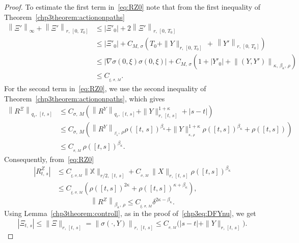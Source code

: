 \documentclass[10pt]{amsart}
\theoremstyle{definition}\newtheorem{defi}[theo]{Definition}\newtheorem{rema}[theo]{Remark}\newtheorem{exam}[theo]{Example}\newtheorem{exem}[theo]{Example}\newtheorem{nota}[theo]{Notation}
\newcommand{\bbX}{\mathbb{X}}
\begin{document}
\begin{proof}
To estimate the first term in~\eqref{eq:RZ0} note that from the first inequality of Theorem~\ref{chp3theorem:actiononpaths}
\begin{equation}\label{chp3eq:Xixiineq}
\begin{split}
\left\|\Xi'\right\|_{\infty}+\left\|\Xi'\right\|_{r,\,\left[0,\,T_0\right]}
&\leq \left|\Xi'_0\right|+2\left\|\Xi'\right\|_{r,\,\left[0,\,T_0\right]}\\
&\leq\left|\Xi'_0\right|+ C_{M,\,{\sigma}}\left(T_0+\|Y\|_{r,\,\left[0,\,T_0\right]}\, +\, \left\|Y'\right\|_{r,\,\left[0,\,T_0\right]}\right)\\
&\leq\left|\nabla \sigma (0, \xi)\sigma(0, \xi)\right|+ C_{M,\,{\sigma}}\left(1+\left|Y'_0\right|+\left\|\left(Y,Y'\right)\right\|_{\kappa,\,\beta_{\kappa},\,\rho}\right)\\
&\leq C_{_{\xi,\,\sigma,\,M}}.
\end{split}
\end{equation} 
For the second term in~\eqref{eq:RZ0}, we use the second inequality of Theorem~\ref{chp3theorem:actiononpaths}, which gives
\begin{equation}\label{chp3eq:Xixiineq2}
\begin{split}
\left\|R^{\Xi}\right\|_{q_r,\,[t,\,s]}
&\leq C_{\sigma,\,M}\left(
\left\|R^Y\right\|_{q_r,\,[t,\,s]}+ \|Y\|_{r, \,[t,\,s]}^{1+\kappa}+|s-t|\right)\\
&\leq C_{\sigma,\,M}\left(
\left\|R^Y\right\|_{_{\beta_{\kappa}},\,\rho}\rho([t,\,s])^{\beta_{\kappa}}+ \|Y\|_{_{\kappa, \,\rho}}^{1+\kappa} \rho([t,s])^{\beta_{\kappa}}+\rho([t,s])\right)\\
&\leq C_{_{\sigma,\,M}}\,\rho([t,s])^{\beta_{\kappa}}. 
\end{split}
\end{equation} 
Consequently, from~\eqref{eq:RZ0}
\begin{align*}
\left|R^Z_{t,\,s}\right|&\leq C_{_{\xi,\,\sigma, M}}\|\bbX\|_{r/2,\,[t,\,s]}+C_{_{\sigma,\,M}}\,\|X\|_{r,\,[t,\,s]}\rho([t,s])^{\beta_{\kappa}}\\
&\leq C_{_{\xi,\,\sigma,\,M}}\left(\rho([t,s])^{2\kappa} +\rho([t,s])^{\kappa+\beta_{\kappa}} \right),
\end{align*}
\begin{equation}\label{eq:RZbdd}
\left\|R^Z\right\|_{\beta_{\kappa},\,\rho}\leq C_{_{\xi,\,\sigma,\,M}}\delta^{2\kappa-\beta_{\kappa}}.
\end{equation}
Using Lemma~\ref{chp3theorem:controll}, as in the proof of~\eqref{chp3eq:DFYnu}, we get
\[
\left|\Xi_{t,\,s}\right|\leq \|\Xi\|_{r,\,[t,\,s]}=\left\|{\sigma}(\cdot, Y)\right\|_{r,\,[t,\,s]}\leq C_{_{\sigma,\,M}}\Big(|s-t|+ \|Y\|_{r,\,[t,\,s]}\Big).
\]
\end{proof}
\end{document}
